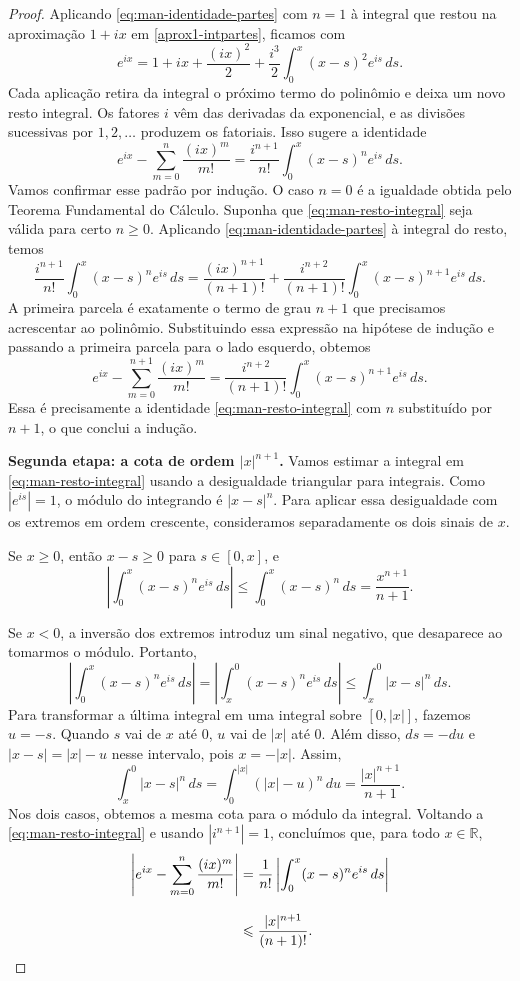 \documentclass[12pt,portuguese]{article}
\theoremstyle{definition}
\theoremstyle{plainexercise}
\theoremstyle{starredexercise}
\theoremstyle{definition}
\begin{document}
\begin{proof}
Aplicando \eqref{eq:man-identidade-partes} com $n=1$ à integral que
restou na aproximação $1+ix$ em \eqref{aprox1-intpartes}, ficamos com
\[
e^{ix}
=1+ix+\frac{(ix)^2}{2}
+\frac{i^3}{2}\int_0^x(x-s)^2e^{is}\,ds.
\]
Cada aplicação retira da integral o próximo termo do polinômio e
deixa um novo resto integral. Os fatores $i$ vêm das derivadas da
exponencial, e as divisões sucessivas por $1,2,\ldots$ produzem os
fatoriais. Isso sugere a identidade
\begin{equation}\label{eq:man-resto-integral}
e^{ix}-\sum_{m=0}^n\frac{(ix)^m}{m!}
=\frac{i^{n+1}}{n!}\int_0^x(x-s)^n e^{is}\,ds.
\end{equation}
Vamos confirmar esse padrão por indução. O caso $n=0$ é a igualdade
obtida pelo Teorema Fundamental do Cálculo. Suponha que
\eqref{eq:man-resto-integral} seja válida para certo $n\geqslant0$.
Aplicando \eqref{eq:man-identidade-partes} à integral do resto, temos
\[
\frac{i^{n+1}}{n!}\int_0^x(x-s)^n e^{is}\,ds
=\frac{(ix)^{n+1}}{(n+1)!}
+\frac{i^{n+2}}{(n+1)!}
\int_0^x(x-s)^{n+1}e^{is}\,ds.
\]
A primeira parcela é exatamente o termo de grau $n+1$ que precisamos
acrescentar ao polinômio. Substituindo essa expressão na hipótese de
indução e passando a primeira parcela para o lado esquerdo, obtemos
\[
e^{ix}-\sum_{m=0}^{n+1}\frac{(ix)^m}{m!}
=\frac{i^{n+2}}{(n+1)!}\int_0^x(x-s)^{n+1}e^{is}\,ds.
\]
Essa é precisamente a identidade \eqref{eq:man-resto-integral} com $n$ substituído por $n+1$,
o que conclui a indução.

\smallskip
\noindent\textbf{Segunda etapa: a cota de ordem $|x|^{n+1}$.}
Vamos estimar a integral em \eqref{eq:man-resto-integral} usando
a desigualdade triangular para integrais. Como $|e^{is}|=1$, o
módulo do integrando é $\left|x-s\right|^n$. Para aplicar essa desigualdade
com os extremos em ordem crescente, consideramos separadamente
os dois sinais de $x$.

Se $x\geqslant0$, então $x-s\geqslant0$ para $s\in[0,x]$, e
\[
\left|\int_0^x(x-s)^n e^{is}\,ds\right|
\leqslant\int_0^x(x-s)^n\,ds
=\frac{x^{n+1}}{n+1}.
\]

Se $x<0$, a inversão dos extremos introduz um sinal negativo,
que desaparece ao tomarmos o módulo. Portanto,
\[
\left|\int_0^x(x-s)^n e^{is}\,ds\right|
=\left|\int_x^0(x-s)^n e^{is}\,ds\right|
\leqslant\int_x^0|x-s|^n\,ds.
\]
Para transformar a última integral em uma integral sobre $[0,|x|]$,
fazemos $u=-s$. Quando $s$ vai de $x$ até $0$, $u$ vai de $|x|$
até $0$. Além disso, $ds=-du$ e $|x-s|=|x|-u$ nesse intervalo,
pois $x=-|x|$. Assim,
\[
\int_x^0|x-s|^n\,ds
=\int_0^{|x|}(|x|-u)^n\,du
=\frac{|x|^{n+1}}{n+1}.
\]
Nos dois casos, obtemos a mesma cota para o módulo da integral.
Voltando a \eqref{eq:man-resto-integral} e usando $|i^{n+1}|=1$,
concluímos que, para todo $x\in\mathbb{R}$,
\begin{align}
\left|e^{ix}-\sum_{m=0}^n\frac{(ix)^m}{m!}\right|
&=\frac{1}{n!}\left|\int_0^x(x-s)^n e^{is}\,ds\right|\notag
\\[0.3cm]
&\leqslant\frac{|x|^{n+1}}{(n+1)!}.
\label{eq:man-cota-resto-grau-n-mais-um}
\end{align}


\end{proof}
\end{document}
